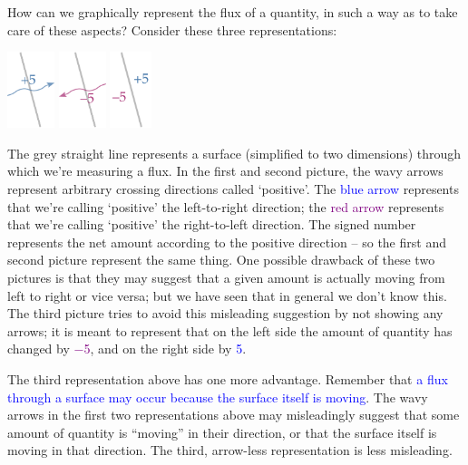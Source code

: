 \documentclass[a4paper,12pt,%
onecolumn,oneside,titlepage,%
british%
]{memoir}
\renewcommand*{\|}[1][]{\nonscript\:#1\vert\nonscript\:\mathopen{}}
\newcommand*{\sect}{\S}%
\renewcommand*{\autoref}[2]{\sidepar{\vspace{-1ex}\footnotesize{\color{blue}\faIcon{%
reply%
}\enspace\sect\,\ref{#1} page\,\pageref{#1}}}\textcolor{blue}{#2}}
\begin{document}
How can we graphically represent the flux of a quantity, in such a way as to take care of these aspects? Consider these three representations:
\begin{center}\label{fig:scalar_fluxes}
\hspace*{\fill}\includegraphics[height=6em]{images/flux_plus5c.pdf}
\hfill\includegraphics[height=6em]{images/flux_minus5c.pdf}
\hfill\includegraphics[height=6em]{images/flux_minusplus5.pdf}
\hspace*{\fill}
\end{center}
The \textcolor{midgrey}{grey straight line} represents a surface (simplified to two dimensions) through which we're measuring a flux. In the first and second picture, the wavy arrows represent arbitrary crossing directions called \enquote*{positive}. The \textcolor{blue}{blue arrow} represents that we're calling \enquote*{positive} the left-to-right direction; the \textcolor{purple}{red arrow} represents that we're calling \enquote*{positive} the right-to-left direction. The signed number represents the net amount according to the positive direction -- so the first and second picture represent the same thing. One possible drawback of these two pictures is that they may suggest that a given amount is actually moving from left to right or vice versa; but we have seen that in general we don't know this.
The third picture tries to avoid this misleading suggestion by not showing any arrows; it is meant to represent that on the left side the amount of quantity has changed by \textcolor{purple}{\num{-5}}, and on the right side by \textcolor{blue}{\num{+5}}.

The third representation above has one more advantage. Remember that \autoref{sec:choice_surfaces}{a flux through a surface may occur because the surface itself is moving}. The wavy arrows in the first two representations above may misleadingly suggest that some amount of quantity is \enquote{moving} in their direction, or that the surface itself is moving in that direction. The third, arrow-less representation is less misleading.
\end{document}
